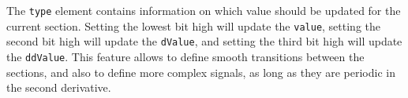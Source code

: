       The \texttt{type} element contains information on which value should be updated for the current section. Setting the lowest bit high will update the \texttt{value}, setting the second bit high will update the \texttt{dValue}, and setting the third bit high will update the \texttt{ddValue}. This feature allows to define smooth transitions between the sections, and also to define more complex signals, as long as they are periodic in the second derivative.


